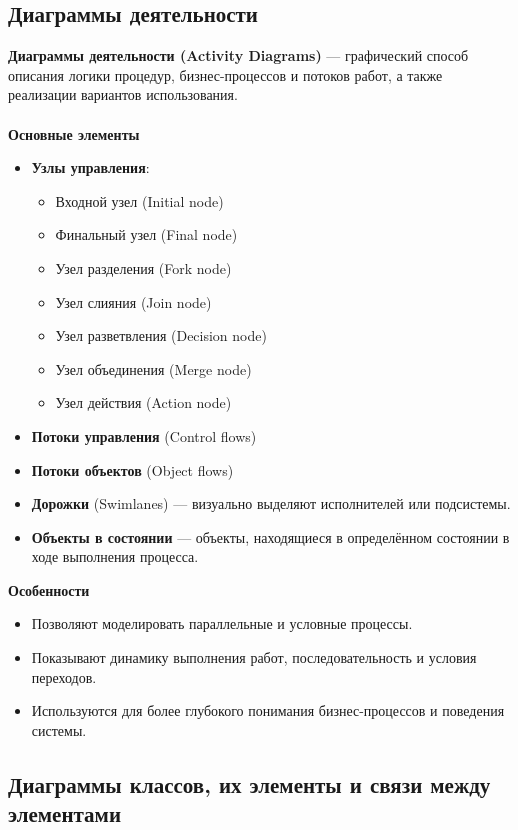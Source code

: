 \documentclass[a4paper, 12pt]{report}
\numberwithin{equation}{section}
\begin{document}
\subsection*{Диаграммы деятельности}

\textbf{Диаграммы деятельности (Activity Diagrams)} — графический способ описания логики процедур, бизнес-процессов и потоков работ, а также реализации вариантов использования.
\\\\
\textbf{Основные элементы}
\begin{itemize}
    \item \textbf{Узлы управления}:
    \begin{itemize}
        \item Входной узел (Initial node)
        \item Финальный узел (Final node)
        \item Узел разделения (Fork node)
        \item Узел слияния (Join node)
        \item Узел разветвления (Decision node)
        \item Узел объединения (Merge node)
        \item Узел действия (Action node)
    \end{itemize}
    \item \textbf{Потоки управления} (Control flows)
    \item \textbf{Потоки объектов} (Object flows)
    \item \textbf{Дорожки} (Swimlanes) — визуально выделяют исполнителей или подсистемы.
    \item \textbf{Объекты в состоянии} — объекты, находящиеся в определённом состоянии в ходе выполнения процесса.
\end{itemize}
\textbf{Особенности}
\begin{itemize}
    \item Позволяют моделировать параллельные и условные процессы.
    \item Показывают динамику выполнения работ, последовательность и условия переходов.
    \item Используются для более глубокого понимания бизнес-процессов и поведения системы.
\end{itemize}

\subsection*{Диаграммы классов, их элементы и связи между элементами}
\end{document}
